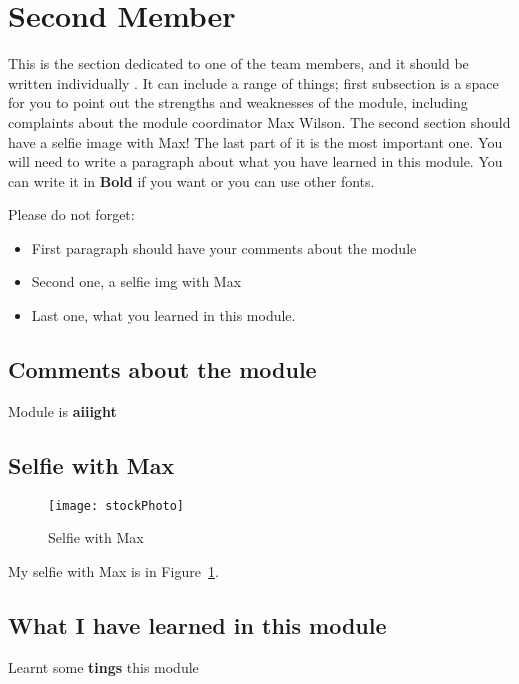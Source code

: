 \section{Second Member}
This is the section dedicated to one of the team members, and it should be written individually . It can include a range of things; first subsection is a space for you to point out the strengths and weaknesses of the module, including complaints about the module coordinator Max Wilson. The second section should have a selfie image with Max! The last part of it is the most important one. You will need to write a paragraph about what you have learned in this module. You can write it in \textbf{Bold} if you want or you can use other fonts. 

Please do not forget:
\begin{itemize}
	\item First paragraph should have your comments about the module
	\item Second one, a selfie img with Max
	\item Last one, what you learned in this module.
\end{itemize}

\subsection{Comments about the module}
Module is \textbf{aiiight}

\subsection{Selfie with Max}


\begin{figure}[h]
\caption{Selfie with Max}
\centering
\texttt{[image: stockPhoto]}

\label{fig:selfie}
\end{figure}


 My selfie with Max is in  Figure~\ref{fig:selfie}.

\subsection{What I have learned in this module}
Learnt some \textbf{tings} this module
